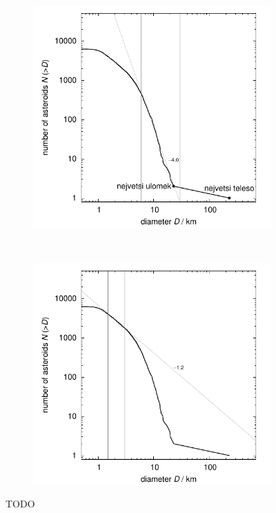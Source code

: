 \documentclass[A4paper, 12pt, oneside]{book}
\begin{document}
\begin{figure}
	\centering
	\begin{subfigure}[b]{0.45\textwidth}
	\includegraphics[width=\textwidth]{obr/size_distribution}
	\end{subfigure} ~
	\begin{subfigure}[b]{0.45\textwidth}
	\includegraphics[width=\textwidth]{obr/size_distribution_SMALLD}
	\end{subfigure}
	\caption{TODO}
	\label{size_distribution}
\end{figure}
\end{document}
